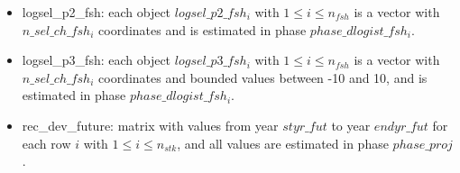 \documentclass{article}
\begin{document}
\begin{itemize}
    
    \item logsel\_p2\_fsh: each object $logsel\_p2\_fsh_i$ with $1\leq i \leq n_{fsh}$ is a vector with $n\_sel\_ch\_fsh_i$ coordinates and is estimated in phase $phase\_dlogist\_fsh_i$.

    
    
    \item logsel\_p3\_fsh: each object $logsel\_p3\_fsh_i$ with $1\leq i \leq n_{fsh}$ is  a  vector with $n\_sel\_ch\_fsh_i$ coordinates and bounded values between -10 and 10, and is estimated in phase $phase\_dlogist\_fsh_i$.
    
    
    \item rec\_dev\_future: matrix with values from year $styr\_fut$ to year $endyr\_fut$ for each row $i$ with $1\leq i \leq n_{stk}$, and all values are estimated in phase $phase\_proj$.
\end{itemize}
\end{document}
